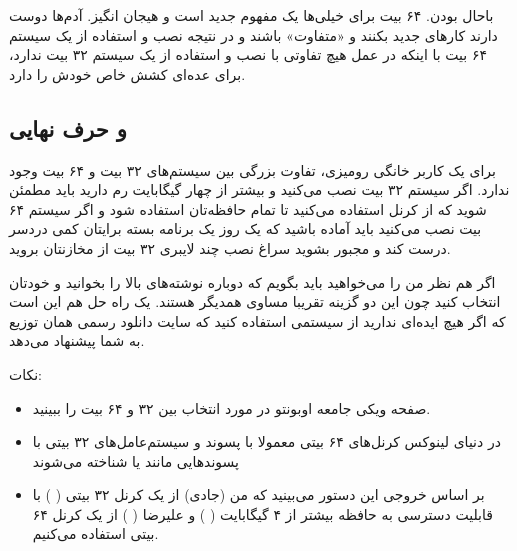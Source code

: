 باحال بودن. ۶۴ بیت برای خیلی‌ها یک مفهوم جدید است و هیجان انگیز. آدم‌ها دوست دارند کارهای جدید بکنند و «متفاوت» باشند و در نتیجه نصب و استفاده از یک سیستم ۶۴ بیت با اینکه در عمل هیچ تفاوتی با نصب و استفاده از یک سیستم ۳۲ بیت ندارد، برای عده‌ای کشش خاص خودش را دارد.

\subsection*{و حرف نهایی}
برای یک کاربر خانگی رومیزی، تفاوت بزرگی بین سیستم‌های ۳۲ بیت و ۶۴ بیت وجود ندارد. اگر سیستم ۳۲ بیت نصب می‌کنید و بیشتر از چهار گیگابایت رم دارید باید مطمئن شوید که از کرنل 
 استفاده می‌کنید تا تمام حافظه‌تان استفاده شود و اگر سیستم ۶۴ بیت نصب می‌کنید باید آماده باشید که یک روز یک برنامه بسته برایتان کمی دردسر درست کند و مجبور بشوید سراغ نصب چند لایبری ۳۲ بیت از مخازنتان بروید.
 
اگر هم نظر من را می‌خواهید باید بگویم که دوباره نوشته‌های بالا را بخوانید و خودتان انتخاب کنید چون این دو گزینه تقریبا مساوی همدیگر هستند. یک راه حل هم این است که اگر هیچ ایده‌ای ندارید از سیستمی استفاده کنید که سایت دانلود رسمی همان توزیع به شما پیشنهاد می‌دهد.

نکات:
\begin{itemize}
\item صفحه ویکی جامعه اوبونتو در مورد انتخاب بین ۳۲ و ۶۴ بیت را ببینید.

\item در دنیای لینوکس کرنل‌های ۶۴ بیتی معمولا با پسوند 
و سیستم‌عامل‌های ۳۲ بیتی با پسوندهایی مانند 
 یا 
 شناخته می‌شوند
\item بر اساس خروجی این دستور می‌بینید که من (جادی) از یک کرنل ۳۲ بیتی (
) با قابلیت دسترسی به حافظه بیشتر از ۴ گیگابایت (
) و علیرضا (
) از یک کرنل ۶۴ بیتی استفاده می‌کنیم.
	\begin{mybox}
		\flushleft
		
		
		
	\end{mybox}
\end{itemize}
